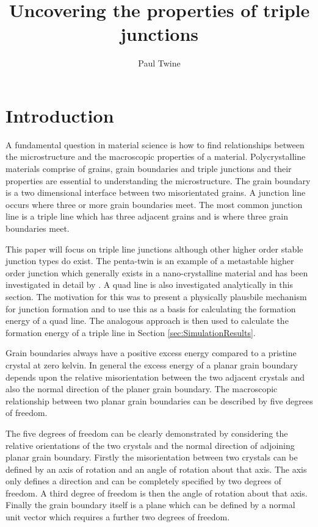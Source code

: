\documentclass[12pt,a4paper]{book}
\begin{document}
\title{Uncovering the properties of triple junctions}
\author{Paul Twine}

\maketitle

\tableofcontents

\chapter{Introduction}

A fundamental question in material science is how to find relationships between the microstructure and the macroscopic properties of a material. Polycrystalline materials comprise of grains, grain boundaries and triple junctions and their properties are essential to understanding the microstructure. The grain boundary is a two dimensional interface between two misorientated grains. A junction line occurs where three or more grain boundaries meet. The most common junction line is a triple line which has three adjacent grains and is where three grain boundaries meet. 

This paper will focus on triple line junctions although other higher order stable junction types do exist. The penta-twin is an example of a metastable higher order junction which generally exists in a nano-crystalline material and has been investigated in detail by \cite{Thomas2016}. A quad line is also investigated analytically in this section. The motivation for this was to present a physically plausbile mechanism for junction formation and to use this as a basis for calculating the formation energy of a quad line. The analogous approach is then used to calculate the formation energy of a triple line in Section \ref{sec:SimulationResults}. 

Grain boundaries always have a positive excess energy compared to a pristine crystal at zero kelvin. In general the excess energy of a planar grain boundary depends upon the relative misorientation between the two adjacent crystals and also the normal direction of the planer grain boundary. The macroscopic relationship between two planar grain boundaries can be described by five degrees of freedom. 

The five degrees of freedom can be clearly demonstrated by considering the relative orientations of the two crystals and the normal direction of adjoining planar grain boundary. Firstly the misorientation between two crystals can be defined by an axis of rotation and an angle of rotation about that axis.  The axis only defines a direction and can be completely specified by two degrees of freedom. A third degree of freedom is then the angle of rotation about that axis. Finally the grain boundary itself is a plane which can be defined by a normal unit vector which requires a further two degrees of freedom.
\end{document}
